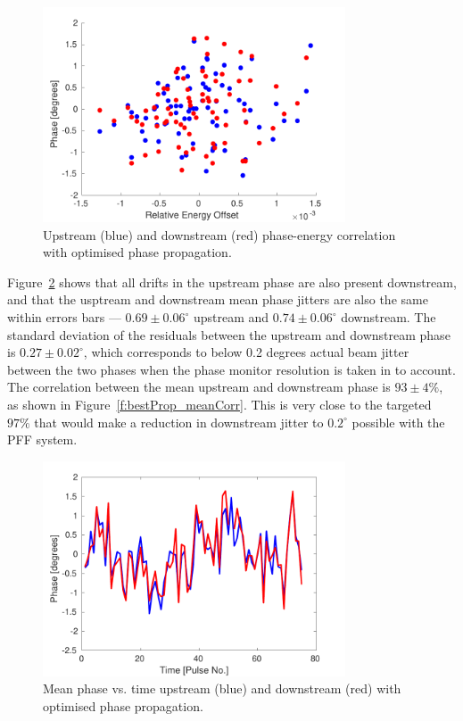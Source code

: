 \begin{figure}
  \centering
  \includegraphics[width=0.8\textwidth]{Figures/propagation/bestProp_enCorr}
  \caption{Upstream (blue) and downstream (red) phase-energy correlation with optimised phase propagation.}
  \label{f:bestProp_enCorr}
\end{figure}

Figure~\ref{f:bestProp_meanPhase} shows that all drifts in the upstream phase are also present downstream, and that the usptream and downstream mean phase jitters are also the same within errors bars --- \(0.69\pm0.06^\circ\) upstream and \(0.74\pm0.06^\circ\) downstream. The standard deviation of the residuals between the upstream and downstream phase is \(0.27\pm0.02^\circ\), which corresponds to below 0.2 degrees actual beam jitter between the two phases when the phase monitor resolution is taken in to account. The correlation between the mean upstream and downstream phase is \(93\pm4\%\), as shown in Figure~\ref{f:bestProp_meanCorr}. This is very close to the targeted \(97\%\) that would make a reduction in downstream jitter to \(0.2^\circ\) possible with the PFF system.

\begin{figure}
  \centering
  \includegraphics[width=0.8\textwidth]{Figures/propagation/bestProp_meanPhase}
  \caption{Mean phase vs. time upstream (blue) and downstream (red) with optimised phase propagation.}
  \label{f:bestProp_meanPhase}
\end{figure}

